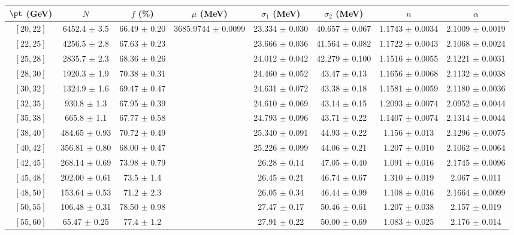 \begin{tabular}{c||c|c|c|c|c|c|c}
$\pt$ (GeV) & $N$ & $f$ (\%) & $\mu$ (MeV) & $\sigma_1$ (MeV) & $\sigma_2$ (MeV) & $n$ & $\alpha$ \\
\hline
$[20, 22]$ & 6452.4 $\pm$ 3.5 & 66.49 $\pm$ 0.20 & \multirow{20}{*}{3685.9744 $\pm$ 0.0099} & 23.334 $\pm$ 0.030 & 40.657 $\pm$ 0.067 & 1.1743 $\pm$ 0.0034 & 2.1009 $\pm$ 0.0019\\
$[22, 25]$ & 4256.5 $\pm$ 2.8 & 67.63 $\pm$ 0.23 &  & 23.666 $\pm$ 0.036 & 41.564 $\pm$ 0.082 & 1.1722 $\pm$ 0.0043 & 2.1068 $\pm$ 0.0024\\
$[25, 28]$ & 2835.7 $\pm$ 2.3 & 68.36 $\pm$ 0.26 &  & 24.012 $\pm$ 0.042 & 42.279 $\pm$ 0.100 & 1.1516 $\pm$ 0.0055 & 2.1221 $\pm$ 0.0031\\
$[28, 30]$ & 1920.3 $\pm$ 1.9 & 70.38 $\pm$ 0.31 &  & 24.460 $\pm$ 0.052 & 43.47 $\pm$ 0.13 & 1.1656 $\pm$ 0.0068 & 2.1132 $\pm$ 0.0038\\
$[30, 32]$ & 1324.9 $\pm$ 1.6 & 69.47 $\pm$ 0.47 &  & 24.631 $\pm$ 0.072 & 43.38 $\pm$ 0.18 & 1.1581 $\pm$ 0.0059 & 2.1180 $\pm$ 0.0036\\
$[32, 35]$ & 930.8 $\pm$ 1.3 & 67.95 $\pm$ 0.39 &  & 24.610 $\pm$ 0.069 & 43.14 $\pm$ 0.15 & 1.2093 $\pm$ 0.0074 & 2.0952 $\pm$ 0.0044\\
$[35, 38]$ & 665.8 $\pm$ 1.1 & 67.77 $\pm$ 0.58 &  & 24.793 $\pm$ 0.096 & 43.71 $\pm$ 0.22 & 1.1407 $\pm$ 0.0074 & 2.1314 $\pm$ 0.0044\\
$[38, 40]$ & 484.65 $\pm$ 0.93 & 70.72 $\pm$ 0.49 &  & 25.340 $\pm$ 0.091 & 44.93 $\pm$ 0.22 & 1.156 $\pm$ 0.013 & 2.1296 $\pm$ 0.0075\\
$[40, 42]$ & 356.81 $\pm$ 0.80 & 68.00 $\pm$ 0.47 &  & 25.226 $\pm$ 0.099 & 44.06 $\pm$ 0.21 & 1.207 $\pm$ 0.010 & 2.1062 $\pm$ 0.0064\\
$[42, 45]$ & 268.14 $\pm$ 0.69 & 73.98 $\pm$ 0.79 &  & 26.28 $\pm$ 0.14 & 47.05 $\pm$ 0.40 & 1.091 $\pm$ 0.016 & 2.1745 $\pm$ 0.0096\\
$[45, 48]$ & 202.00 $\pm$ 0.61 & 73.5 $\pm$ 1.4 &  & 26.45 $\pm$ 0.21 & 46.74 $\pm$ 0.67 & 1.310 $\pm$ 0.019 & 2.067 $\pm$ 0.011\\
$[48, 50]$ & 153.64 $\pm$ 0.53 & 71.2 $\pm$ 2.3 &  & 26.05 $\pm$ 0.34 & 46.44 $\pm$ 0.99 & 1.108 $\pm$ 0.016 & 2.1664 $\pm$ 0.0099\\
$[50, 55]$ & 106.48 $\pm$ 0.31 & 78.50 $\pm$ 0.98 &  & 27.47 $\pm$ 0.17 & 50.46 $\pm$ 0.61 & 1.207 $\pm$ 0.038 & 2.157 $\pm$ 0.019\\
$[55, 60]$ & 65.47 $\pm$ 0.25 & 77.4 $\pm$ 1.2 &  & 27.91 $\pm$ 0.22 & 50.00 $\pm$ 0.69 & 1.083 $\pm$ 0.025 & 2.176 $\pm$ 0.014\\

\end{tabular}
